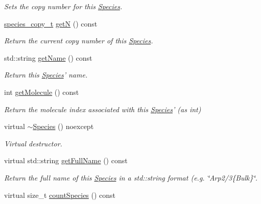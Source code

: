 \begin{DoxyCompactItemize}
\begin{DoxyCompactList}\small\item\em Sets the copy number for this \hyperlink{classchem_1_1Species}{Species}. \end{DoxyCompactList}\item 
\hyperlink{common_8h_a3503f321fd36304ee274141275cca586}{species\-\_\-copy\-\_\-t} \hyperlink{classchem_1_1Species_af7c9f51060b84169b428a7796dad6dca}{get\-N} () const 
\begin{DoxyCompactList}\small\item\em Return the current copy number of this \hyperlink{classchem_1_1Species}{Species}. \end{DoxyCompactList}\item 
std\-::string \hyperlink{classchem_1_1Species_aa32c8f7fb344c68539a927c6a7f916c7}{get\-Name} () const 
\begin{DoxyCompactList}\small\item\em Return this \hyperlink{classchem_1_1Species}{Species}' name. \end{DoxyCompactList}\item 
int \hyperlink{classchem_1_1Species_a330ef4514a8979a6ea0e6f71ed5cb820}{get\-Molecule} () const 
\begin{DoxyCompactList}\small\item\em Return the molecule index associated with this \hyperlink{classchem_1_1Species}{Species}' (as int) \end{DoxyCompactList}\item 
virtual \hyperlink{classchem_1_1Species_afb5803da12a3192f0c1b5bcbea4054d7}{$\sim$\-Species} () noexcept
\begin{DoxyCompactList}\small\item\em Virtual destructor. \end{DoxyCompactList}\item 
virtual std\-::string \hyperlink{classchem_1_1Species_a7ac7196a7146f63e297d0995c6081f4b}{get\-Full\-Name} () const 
\begin{DoxyCompactList}\small\item\em Return the full name of this \hyperlink{classchem_1_1Species}{Species} in a std\-::string format (e.\-g. \char`\"{}\-Arp2/3\{\-Bulk\}\char`\"{}. \end{DoxyCompactList}\item 
virtual size\-\_\-t \hyperlink{classchem_1_1Species_a5e8aedfe4c4b5e08fb0ee672c3d80ace}{count\-Species} () const 
\end{DoxyCompactItemize}
